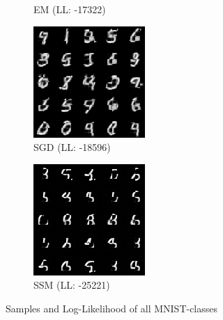 \begin{figure}[H]
\begin{subfigure}[b]{0.24\textwidth}
        \caption{EM (LL: -17322)}
    \end{subfigure}
    \begin{subfigure}[b]{0.24\textwidth}
        \centering
        \includegraphics[width=\textwidth]{figures/einsum/mnist/[]_SGD.png} 
        \caption{SGD (LL: -18596)}
    \end{subfigure}
    \begin{subfigure}[b]{0.24\textwidth}
        \centering
        \includegraphics[width=\textwidth]{figures/einsum/mnist/[]_SSM.png}
        \caption{SSM (LL: -25221)}
    \end{subfigure}
    \caption{Samples and Log-Likelihood of all MNIST-classes}
    \label{fig:mnist7}
\end{figure}

